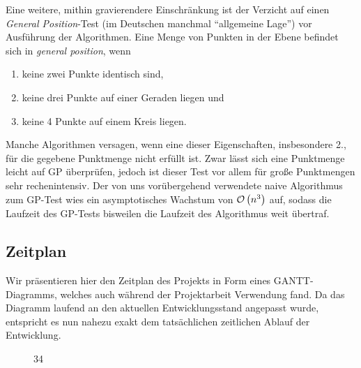 Eine weitere, mithin gravierendere Einschränkung ist der Verzicht auf einen \emph{General Position}-Test (im Deutschen manchmal \enquote{allgemeine Lage}) vor Ausführung der Algorithmen. Eine Menge von Punkten in der Ebene befindet sich in \emph{general position}, wenn
\begin{enumerate}
\item keine zwei Punkte identisch sind,
\item keine drei Punkte auf einer Geraden liegen und
\item keine 4 Punkte auf einem Kreis liegen.
\end{enumerate}
Manche Algorithmen versagen, wenn eine dieser Eigenschaften, insbesondere 2., für die gegebene Punktmenge nicht erfüllt ist. Zwar lässt sich eine Punktmenge leicht auf GP überprüfen, jedoch ist dieser Test vor allem für große Punktmengen sehr rechenintensiv. Der von uns vorübergehend verwendete naive Algorithmus zum GP-Test wies ein asymptotisches Wachstum von $\mathcal{O}\left(n^3\right)$ auf, sodass die Laufzeit des GP-Tests bisweilen die Laufzeit des Algorithmus weit übertraf.

\subsection{Zeitplan}
Wir präsentieren hier den Zeitplan des Projekts in Form eines GANTT-Diagramms, welches auch während der Projektarbeit Verwendung fand. Da das Diagramm laufend an den aktuellen Entwicklungsstand angepasst wurde, entspricht es nun nahezu exakt dem tatsächlichen zeitlichen Ablauf der Entwicklung.

\begin{figure}[h]
\begin{center}
\begin{PstGanttChart}[yunit=2,ChartUnitIntervalName=Month,TaskUnitIntervalValue=30,TaskUnitType=Month,ChartShowIntervals]{3}{4}
\end{PstGanttChart}
\end{center}
\label{fig:gantt}
\end{figure}

